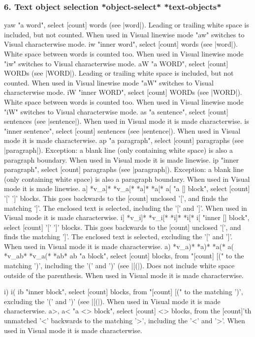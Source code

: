 \documentclass{beamer}
\begin{document}
\begin{frame}
    \frametitle{6. Text object selection			*object-select* *text-objects*}
    yaw			"a word", select [count] words (see |word|).
    Leading or trailing white space is included, but not
    counted.
    When used in Visual linewise mode "aw" switches to
    Visual characterwise mode.
    iw			"inner word", select [count] words (see |word|).
    White space between words is counted too.
    When used in Visual linewise mode "iw" switches to
    Visual characterwise mode.
    aW			"a WORD", select [count] WORDs (see |WORD|).
    Leading or trailing white space is included, but not
    counted.
    When used in Visual linewise mode "aW" switches to
    Visual characterwise mode.
    iW			"inner WORD", select [count] WORDs (see |WORD|).
    White space between words is counted too.
    When used in Visual linewise mode "iW" switches to
    Visual characterwise mode.
    as			"a sentence", select [count] sentences (see
    |sentence|).
    When used in Visual mode it is made characterwise.
    is			"inner sentence", select [count] sentences (see
    |sentence|).
    When used in Visual mode it is made characterwise.
    ap			"a paragraph", select [count] paragraphs (see
    |paragraph|).
    Exception: a blank line (only containing white space)
    is also a paragraph boundary.
    When used in Visual mode it is made linewise.
    ip			"inner paragraph", select [count] paragraphs (see
    |paragraph|).
    Exception: a blank line (only containing white space)
    is also a paragraph boundary.
    When used in Visual mode it is made linewise.
a]						*v\_a]* *v\_a[* *a]* *a[*
  a[			"a [] block", select [count] '[' ']' blocks.  This
    goes backwards to the [count] unclosed '[', and finds
    the matching ']'.  The enclosed text is selected,
    including the '[' and ']'.
    When used in Visual mode it is made characterwise.
i]						*v\_i]* *v\_i[* *i]* *i[*
  i[			"inner [] block", select [count] '[' ']' blocks.  This
    goes backwards to the [count] unclosed '[', and finds
    the matching ']'.  The enclosed text is selected,
    excluding the '[' and ']'.
    When used in Visual mode it is made characterwise.
    a)							*v\_a)* *a)* *a(*
    a(							*v\_ab* *v\_a(* *ab*
    ab			"a block", select [count] blocks, from "[count] [(" to
      the matching ')', including the '(' and ')' (see
      |[(|).  Does not include white space outside of the
        parenthesis.
        When used in Visual mode it is made characterwise.

        i) i(	ib			"inner block", select [count] blocks, from "[count] [("
          to the matching ')', excluding the '(' and ')' (see
          |[(|).
            When used in Visual mode it is made characterwise.
            a>, a<			"a <> block", select [count] <> blocks, from the
            [count]'th unmatched '<' backwards to the matching
            '>', including the '<' and '>'.
            When used in Visual mode it is made characterwise.


\end{frame}
\end{document}
